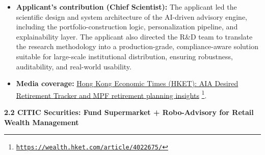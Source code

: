 \documentclass[11pt]{article}
\newcommand{\CVSubsection}[1]{\textbf{#1}\par}
\newenvironment{tightitemize}{%
  \begin{itemize}[leftmargin=*,nosep,topsep=2pt]
}{\end{itemize}}
\begin{document}
\begin{tightitemize}
\begin{tightitemize}
    \item \textbf{Builds confidence and autonomy:} Empowers everyday users to make better retirement decisions with greater clarity, consistency, and control.
  \end{tightitemize}
  \item \textbf{Applicant’s contribution (Chief Scientist):} The applicant led the scientific design and system architecture of the AI-driven advisory engine, including the portfolio-construction logic, personalization pipeline, and explainability layer. The applicant also directed the R\&D team to translate the research methodology into a production-grade, compliance-aware solution suitable for large-scale institutional distribution, ensuring robustness, auditability, and real-world usability.
  \item \textbf{Media coverage:}
\href{https://wealth.hket.com/article/4022675/}{Hong Kong Economic Times (HKET): AIA Desired Retirement Tracker and MPF retirement planning insights}%
\footnote{\href{https://wealth.hket.com/article/4022675/}{\texttt{https://wealth.hket.com/article/4022675/}}}.
\end{tightitemize}

\CVSubsection{2.2 CITIC Securities: Fund Supermarket + Robo-Advisory for Retail Wealth Management}
\end{document}
